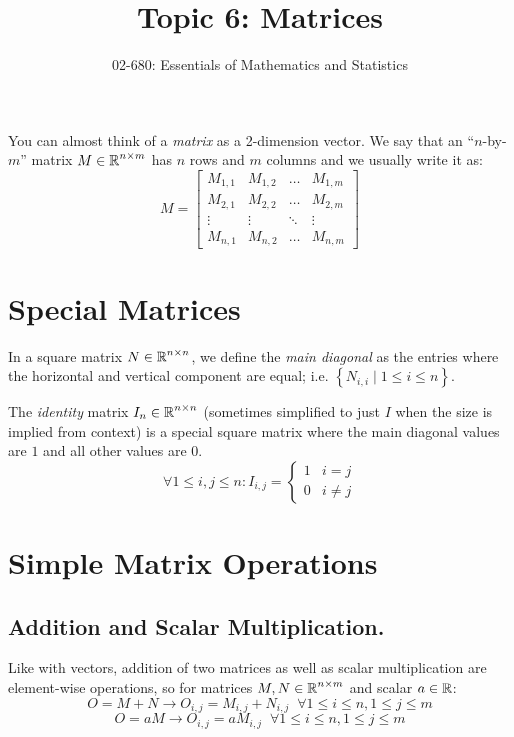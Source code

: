 


\title{Topic 6: Matrices}
\author{02-680: Essentials of Mathematics and Statistics}


\maketitle

You can almost think of a \emph{matrix} as a 2-dimension vector. 
We say that an ``$n$-by-$m$'' matrix $M \in \operatorname{\mathbb{R}}^{n\times m}$ has $n$ rows and $m$ columns and we usually write it as:
\[
M = \left[\begin{matrix}
M_{1,1}& 	M_{1,2}& 	\dots& M_{1,m}\\
M_{2,1}& 	M_{2,2}& 	\dots& M_{2,m}\\ 
\vdots & \vdots & \ddots & \vdots \\ 
M_{n,1}& 	M_{n,2}& 	\dots& M_{n,m}
\end{matrix}\right]
\]

\section{Special Matrices}
In a square matrix $N\in\operatorname{\mathbb{R}}^{n\times n}$, we define the \emph{main diagonal} as the entries where the horizontal and vertical component are equal; 
i.e. $\left\{N_{i,i} \mid 1 \le i \le n\right\}$. 

The \emph{identity} matrix $I_n \in\operatorname{\mathbb{R}}^{n\times n}$ (sometimes simplified to just $I$ when the size is implied from context) 
is a special square matrix where the main diagonal values are $1$ and all other values are $0$.
\[
\forall 1 \le i,j \le n : I_{i,j} = \begin{cases} 1 & i=j\\ 0 & i\ne j\end{cases}
\]

\section{Simple Matrix Operations}

\subsection{Addition and Scalar Multiplication.}
Like with vectors, addition of two matrices as well as scalar multiplication are element-wise operations, so for matrices $M,N \in \operatorname{\mathbb{R}}^{n\times m}$ and scalar $a\in\operatorname{\mathbb{R}}$:
\[O = M+N \rightarrow O_{i,j} = M_{i,j} + N_{i,j} \;\; \forall 1 \le i \le n, 1 \le j \le m\]
\[O = aM \rightarrow O_{i,j} = a M_{i,j} \;\; \forall 1 \le i \le n, 1 \le j \le m\]

